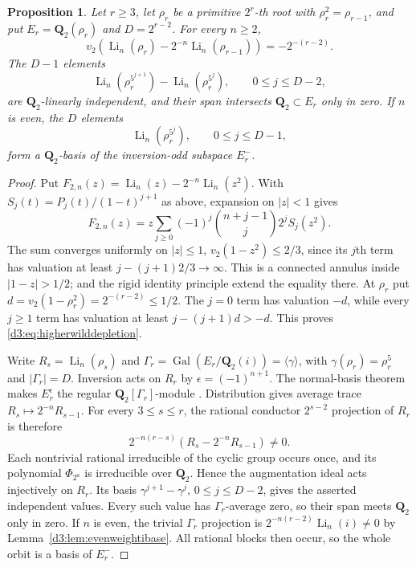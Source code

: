 \documentclass[11pt,a4paper]{amsart}
\numberwithin{equation}{section}
\newtheorem{proposition}[theorem]{Proposition}
\theoremstyle{definition}
\theoremstyle{remark}
\newcommand{\Q}{\mathbf Q}
\newcommand{\Gal}{\operatorname{Gal}}
\begin{document}
\begin{proposition}
\label{d3:prop:higherwildaugmentation}
Let $r\geq3$, let $\rho_r$ be a primitive $2^r$-th root with
$\rho_r^2=\rho_{r-1}$, and put
$E_r=\Q_2(\rho_r)$ and $D=2^{r-2}$.
For every $n\geq2$,
\begin{equation}\label{d3:eq:higherwilddepletion}
 v_2\left(\operatorname{Li}_n(\rho_r)
       -2^{-n}\operatorname{Li}_n(\rho_{r-1})\right)
 =-2^{-(r-2)}.
\end{equation}
The $D-1$ elements
\[
 \operatorname{Li}_n(\rho_r^{5^{j+1}})
 -\operatorname{Li}_n(\rho_r^{5^j}),
 \qquad 0\leq j\leq D-2,
\]
are $\Q_2$-linearly independent, and their span intersects
$\Q_2\subset E_r$ only in zero.
If $n$ is even, the $D$ elements
\[
 \operatorname{Li}_n(\rho_r^{5^j}),\qquad 0\leq j\leq D-1,
\]
form a $\Q_2$-basis of the inversion-odd subspace $E_r^-$.
\end{proposition}
\begin{proof}
Put $F_{2,n}(z)=\operatorname{Li}_n(z)-2^{-n}\operatorname{Li}_n(z^2)$.
With $S_j(t)=P_j(t)/(1-t)^{j+1}$ as above, expansion on $|z|<1$ gives
\[
 F_{2,n}(z)=z\sum_{j\geq0}(-1)^j
       \binom{n+j-1}{j}2^j S_j(z^2).
\]
The sum converges uniformly on
$|z|\leq1$, $v_2(1-z^2)\leq2/3$, since its $j$th term has
valuation at least $j-(j+1)2/3\to\infty$.
This is a connected annulus inside $|1-z|>1/2$;
\cite[Theorem~2.7(3)]{BesserDeJeuAlgorithm} and the rigid identity
principle extend the equality there. At $\rho_r$ put
$d=v_2(1-\rho_r^2)=2^{-(r-2)}\leq1/2$.
The $j=0$ term has valuation $-d$, while every $j\geq1$ term
has valuation at least $j-(j+1)d>-d$.
This proves \eqref{d3:eq:higherwilddepletion}.

Write $R_s=\operatorname{Li}_n(\rho_s)$ and
$\Gamma_r=\Gal(E_r/\Q_2(i))=\langle\gamma\rangle$, with
$\gamma(\rho_r)=\rho_r^5$ and $|\Gamma_r|=D$.
Inversion acts on $R_r$ by $\epsilon=(-1)^{n+1}$.
The normal-basis theorem makes $E_r^\epsilon$ the regular
$\Q_2[\Gamma_r]$-module \cite[Chapter~I, p.~34]{MilneDuality}. Distribution gives average trace
$R_s\mapsto2^{-n}R_{s-1}$.
For every $3\leq s\leq r$, the rational conductor
$2^{s-2}$ projection of $R_r$ is therefore
\[
 2^{-n(r-s)}(R_s-2^{-n}R_{s-1})\ne0.
\]
Each nontrivial rational irreducible of the cyclic group occurs
once, and its polynomial $\Phi_{2^a}$ is irreducible over $\Q_2$.
Hence the augmentation ideal acts injectively on $R_r$.
Its basis $\gamma^{j+1}-\gamma^j$, $0\leq j\leq D-2$, gives
the asserted independent values. Every such value has
$\Gamma_r$-average zero, so their span meets $\Q_2$ only in zero.
If $n$ is even, the trivial $\Gamma_r$ projection is
$2^{-n(r-2)}\operatorname{Li}_n(i)\ne0$ by
Lemma~\ref{d3:lem:evenweightibase}. All rational blocks then occur,
so the whole orbit is a basis of $E_r^-$.
\end{proof}
\end{document}

